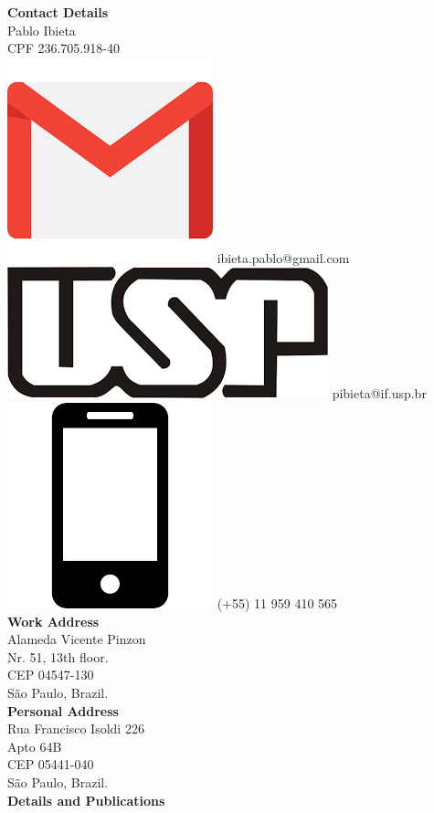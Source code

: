 \documentclass[a4paper,12pt,final]{memoir}
\begin{document}
\begin{flushleft}\small
    \vspace{10mm}
    \textbf{Contact Details}\\
    \vspace{1mm}
	Pablo Ibieta\\
	\vspace{1mm}
	CPF 236.705.918-40 \\
	\vspace{1mm}
    \includegraphics[width=0.07\columnwidth]{gmail_icon.png} ibieta.pablo@gmail.com \\
    \vspace{1mm}
    \includegraphics[width=0.08\columnwidth]{usp_icon.png} pibieta@if.usp.br \\
    \includegraphics[width=0.07\columnwidth]{cellphone_icon.png} (+55) 11 959 410 565 \\	
	\vspace{4mm}
	\textbf{Work Address}\\
	\vspace{1mm}
	Alameda Vicente Pinzon\\
	\vspace{1mm}
	Nr. 51, 13th floor. \\
	\vspace{1mm}
	CEP 04547-130\\
	\vspace{1mm}
	S\~{a}o Paulo, Brazil.\\
	\vspace{4mm}
	\textbf{Personal Address}\\
	\vspace{1mm}
	Rua Francisco Isoldi 226 \\
	\vspace{1mm}
	Apto 64B \\
	\vspace{1mm}
	CEP 05441-040 \\
	\vspace{1mm}
	S\~{a}o Paulo, Brazil.\\
	\vspace{4mm}
	\textbf{Details and Publications}\\

\end{flushleft}
\end{document}
